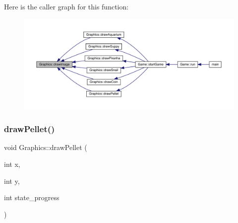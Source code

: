 Here is the caller graph for this function\+:\nopagebreak
\begin{figure}[H]
\begin{center}
\leavevmode
\includegraphics[width=350pt]{class_graphics_afe0ce82b917ad83b8eaec222810f1efd_icgraph}
\end{center}
\end{figure}
\mbox{\label{class_graphics_a63bc7bf1f68cfc785f08b6863d3034d2}} 
\subsubsection{\texorpdfstring{draw\+Pellet()}{drawPellet()}}
{\footnotesize\ttfamily void Graphics\+::draw\+Pellet (\begin{DoxyParamCaption}\item[{int}]{x,  }\item[{int}]{y,  }\item[{int}]{state\+\_\+progress }\end{DoxyParamCaption})}

